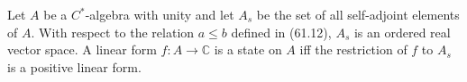 Let $A$ be a $C^*$-algebra with unity and let $A_s$ be the set of all self-adjoint elements of $A$. With respect to the relation $a \leq b$ defined in (61.12), $A_s$ is an ordered real vector space. A linear form $f: A \to \mathbb{C}$ is a state on $A$ iff the restriction of $f$ to $A_s$ is a positive linear form.
